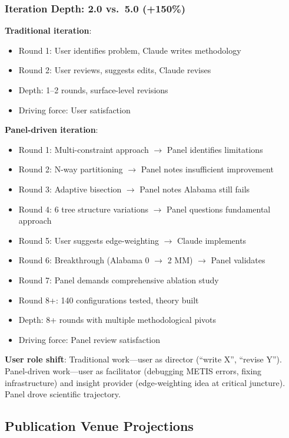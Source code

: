 \subsubsection{Iteration Depth: 2.0 vs.\ 5.0 (+150\%)}

\textbf{Traditional iteration}:
\begin{itemize}[leftmargin=*]
\item Round 1: User identifies problem, Claude writes methodology
\item Round 2: User reviews, suggests edits, Claude revises
\item Depth: 1--2 rounds, surface-level revisions
\item Driving force: User satisfaction
\end{itemize}

\textbf{Panel-driven iteration}:
\begin{itemize}[leftmargin=*]
\item Round 1: Multi-constraint approach $\to$ Panel identifies limitations
\item Round 2: N-way partitioning $\to$ Panel notes insufficient improvement
\item Round 3: Adaptive bisection $\to$ Panel notes Alabama still fails
\item Round 4: 6 tree structure variations $\to$ Panel questions fundamental approach
\item Round 5: User suggests edge-weighting $\to$ Claude implements
\item Round 6: Breakthrough (Alabama 0 $\to$ 2 MM) $\to$ Panel validates
\item Round 7: Panel demands comprehensive ablation study
\item Round 8+: 140 configurations tested, theory built
\item Depth: 8+ rounds with multiple methodological pivots
\item Driving force: Panel review satisfaction
\end{itemize}

\textbf{User role shift}: Traditional work---user as director (``write X'', ``revise Y''). Panel-driven work---user as facilitator (debugging METIS errors, fixing infrastructure) and insight provider (edge-weighting idea at critical juncture). Panel drove scientific trajectory.

\subsection{Publication Venue Projections}

